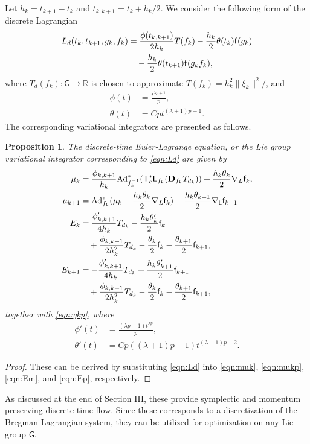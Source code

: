 \documentclass[letterpaper, 10pt, conference]{ieeeconf}
\newcommand{\G}{\ensuremath{\mathsf{G}}}
\newcommand{\T}{\ensuremath{\mathsf{T}}}
\renewcommand{\L}{\ensuremath{\mathsf{L}}}
\renewcommand{\Re}{\ensuremath{\mathbb{R}}}
\newcommand{\D}{\ensuremath{\mathbf{D}}}
\newcommand{\Ad}{\ensuremath{\mathrm{Ad}}}
\newtheorem{prop}{Proposition}
\begin{document}
Let $h_k = t_{k+1}- t_k$ and $t_{k,k+1} = t_k + h_k/2$.  
We consider the following form of the discrete Lagrangian
\begin{align}
    L_d(t_k, t_{k+1}, g_k, f_k ) & = \frac{\phi(t_{k,k+1}) }{2 h_k} T(f_k) -\frac{h_k}{2} \theta(t_k) \mathsf{f} (g_k)\nonumber \\
                                 & \quad -\frac{h_k}{2} \theta(t_{k+1}) \mathsf{f} (g_kf_k), \label{eqn:Ld}
\end{align}
where $T_d(f_k):\G\rightarrow\Re$ is chosen to approximate $T(f_k) =h_k^2 \|\xi_k \|^2/$, and
\begin{align}
    \phi(t) & = \frac{t^{\lambda p +1}}{p},\\
    \theta(t) & = C p t^{(\lambda+1)p-1}.
\end{align}
The corresponding variational integrators are presented as follows. 
\begin{prop}
    The discrete-time Euler-Lagrange equation, or the Lie group variational integrator corresponding to \eqref{eqn:Ld} are given by
\begin{align}
    \mu_k & =  \frac{\phi_{k,k+1}}{h_k}\Ad^*_{f_k^{-1}} (\T^*_e\L_{f_k}(\D_{f_k} T_{d_k})) + \frac{h_k\theta_k}{2} \nabla_L \obj_k, \\
    \mu_{k+1} & = \Ad^*_{f_k}( \mu_k - \frac{h_k\theta_k}{2} \nabla_L\obj_k ) -\frac{h_k\theta_{k+1}}{2} \nabla_\L \obj_{k+1}\\
    E_{k} & = \frac{\phi'_{k,k+1}}{ 4 h_k} T_{d_k} -\frac{h_k\theta'_{k}}{2} \obj_{k} \nonumber\\\
          & \quad + \frac{\phi_{k,k+1}}{2h_k^2}T_{d_k} -\frac{\theta_k}{2}\obj_k - \frac{\theta_{k+1}}{2}\obj_{k+1},\\
    E_{k+1} & = -\frac{\phi'_{k,k+1}}{ 4 h_k} T_{d_k} +\frac{h_k\theta'_{k+1}}{2} \obj_{k+1}\nonumber \\\
            & \quad + \frac{\phi_{k,k+1}}{2h_k^2}T_{d_k} -\frac{\theta_k}{2}\obj_k - \frac{\theta_{k+1}}{2}\obj_{k+1},
\end{align}
together with \eqref{eqn:gkp}, where
\begin{align*}
    \phi'(t) & = \frac{(\lambda p +1) t^{\lambda p}}{p}, \\
    \theta'(t) &  = Cp((\lambda+1)p-1) t^{(\lambda +1)p-2}.
\end{align*}
\end{prop}
\begin{proof}
    These can be derived by substituting \eqref{eqn:Ld} into \eqref{eqn:muk}, \eqref{eqn:mukp}, \eqref{eqn:Em}, and \eqref{eqn:Ep}, respectively. 
\end{proof}
As discussed at the end of Section III, these provide symplectic and momentum preserving discrete time flow.
Since these corresponds to a discretization of the Bregman Lagrangian system, they can be utilized for optimization on any Lie group $\G$. 
\end{document}
